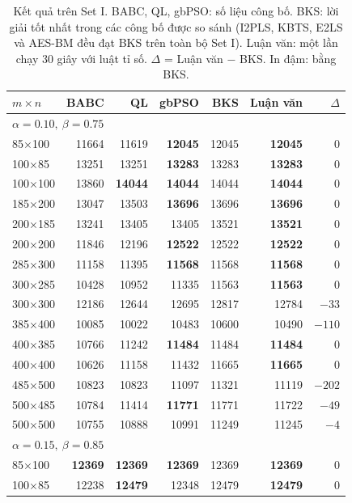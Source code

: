 \begin{table}[H]
\centering
\caption[Kết quả trên Set I]{Kết quả trên Set I. BABC, QL, gbPSO: số liệu công bố. BKS: lời giải tốt nhất trong các công bố được so sánh (I2PLS, KBTS, E2LS và AES-BM đều đạt BKS trên toàn bộ Set I). Luận văn: một lần chạy 30 giây với luật tỉ số. $\Delta$ = Luận văn $-$ BKS. In đậm: bằng BKS.}
\label{tab:set1}
\small
\begin{tabular}{lrrrrrr}
\toprule
$m\times n$ & BABC & QL & gbPSO & BKS & Luận văn & $\Delta$\\
\midrule
\multicolumn{7}{l}{$\alpha=0.10,\ \beta=0.75$}\\
85$\times$100 & 11664 & 11619 & \textbf{12045} & 12045 & \textbf{12045} & 0\\
100$\times$85 & 13251 & 13251 & \textbf{13283} & 13283 & \textbf{13283} & 0\\
100$\times$100 & 13860 & \textbf{14044} & \textbf{14044} & 14044 & \textbf{14044} & 0\\
185$\times$200 & 13047 & 13503 & \textbf{13696} & 13696 & \textbf{13696} & 0\\
200$\times$185 & 13241 & 13405 & 13405 & 13521 & \textbf{13521} & 0\\
200$\times$200 & 11846 & 12196 & \textbf{12522} & 12522 & \textbf{12522} & 0\\
285$\times$300 & 11158 & 11395 & \textbf{11568} & 11568 & \textbf{11568} & 0\\
300$\times$285 & 10428 & 10952 & 11335 & 11563 & \textbf{11563} & 0\\
300$\times$300 & 12186 & 12644 & 12695 & 12817 & 12784 & $-33$\\
385$\times$400 & 10085 & 10022 & 10483 & 10600 & 10490 & $-110$\\
400$\times$385 & 10766 & 11242 & \textbf{11484} & 11484 & \textbf{11484} & 0\\
400$\times$400 & 10626 & 11158 & 11432 & 11665 & \textbf{11665} & 0\\
485$\times$500 & 10823 & 10823 & 11097 & 11321 & 11119 & $-202$\\
500$\times$485 & 10784 & 11414 & \textbf{11771} & 11771 & 11722 & $-49$\\
500$\times$500 & 10755 & 10888 & 10991 & 11249 & 11245 & $-4$\\
\midrule
\multicolumn{7}{l}{$\alpha=0.15,\ \beta=0.85$}\\
85$\times$100 & \textbf{12369} & \textbf{12369} & \textbf{12369} & 12369 & \textbf{12369} & 0\\
100$\times$85 & 12238 & \textbf{12479} & 12348 & 12479 & \textbf{12479} & 0\\

\end{tabular}
\end{table}
